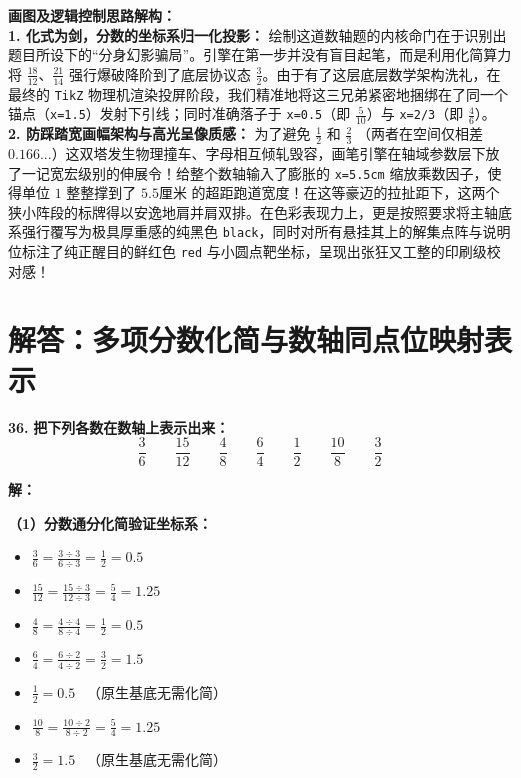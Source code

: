 \vspace{0.4cm}
{\small\color{blue!70!black}
\textbf{画图及逻辑控制思路解构：}\\
\textbf{1. 化式为剑，分数的坐标系归一化投影：} 绘制这道数轴题的内核命门在于识别出题目所设下的“分身幻影骗局”。引擎在第一步并没有盲目起笔，而是利用化简算力将 $\frac{18}{12}、\frac{21}{14}$ 强行爆破降阶到了底层协议态 $\frac{3}{2}$。由于有了这层底层数学架构洗礼，在最终的 \texttt{TikZ} 物理机渲染投屏阶段，我们精准地将这三兄弟紧密地捆绑在了同一个锚点（\texttt{x=1.5}）发射下引线；同时准确落子于 \texttt{x=0.5}（即 $\frac{5}{10}$）与 \texttt{x=2/3}（即 $\frac{4}{6}$）。\\
\textbf{2. 防踩踏宽画幅架构与高光呈像质感：} 为了避免 $\frac{1}{2}$ 和 $\frac{2}{3}$ （两者在空间仅相差 $0.166...$）这双塔发生物理撞车、字母相互倾轧毁容，画笔引擎在轴域参数层下放了一记宽宏级别的伸展令！给整个数轴输入了膨胀的 \texttt{x=5.5cm} 缩放乘数因子，使得单位 $1$ 整整撑到了 $5.5\text{厘米}$ 的超距跑道宽度！在这等豪迈的拉扯距下，这两个狭小阵段的标牌得以安逸地肩并肩双排。在色彩表现力上，更是按照要求将主轴底系强行覆写为极具厚重感的纯黑色 \texttt{black}，同时对所有悬挂其上的解集点阵与说明位标注了纯正醒目的鲜红色 \texttt{red} 与小圆点靶坐标，呈现出张狂又工整的印刷级校对感！
}

\newpage



\section{解答：多项分数化简与数轴同点位映射表示}

\vspace{0.6cm}

\textbf{\LARGE 36.} \textbf{把下列各数在数轴上表示出来：}
\[
\frac{3}{6} \qquad \frac{15}{12} \qquad \frac{4}{8} \qquad \frac{6}{4} \qquad \frac{1}{2} \qquad \frac{10}{8} \qquad \frac{3}{2}
\]

\vspace{0.4cm}
\textbf{解：}

\textbf{（1）分数通分化简验证坐标系：}
\begin{itemize}
    \item $\displaystyle \frac{3}{6} = \frac{3 \div 3}{6 \div 3} = \frac{1}{2} = 0.5$
    \item $\displaystyle \frac{15}{12} = \frac{15 \div 3}{12 \div 3} = \frac{5}{4} = 1.25$
    \item $\displaystyle \frac{4}{8} = \frac{4 \div 4}{8 \div 4} = \frac{1}{2} = 0.5$
    \item $\displaystyle \frac{6}{4} = \frac{6 \div 2}{4 \div 2} = \frac{3}{2} = 1.5$
    \item $\displaystyle \frac{1}{2} = 0.5$ \ （原生基底无需化简）
    \item $\displaystyle \frac{10}{8} = \frac{10 \div 2}{8 \div 2} = \frac{5}{4} = 1.25$
    \item $\displaystyle \frac{3}{2} = 1.5$ \ （原生基底无需化简）
\end{itemize}


